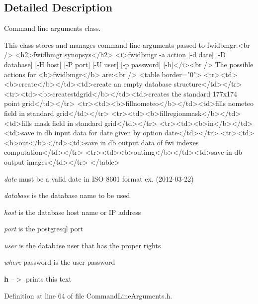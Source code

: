 \subsection{Detailed Description}
Command line arguments class. 

\begin{DoxyVerb}     This class stores and manages command line arguments passed to fwidbmgr.<br />
     <h2>fwidbmgr synopsys</h2>
     <i>fwidbmgr -a action [-d date] [-D database] [-H host] [-P port] [-U user] [-p password] [-h]</i><br />
     The possible actions for <b>fwidbmgr</b> are:<br />
     <table border="0">
       <tr><td><b>create</b></td><td>create an empty database structure</td></tr>
       <tr><td><b>createstdgrid</b></td><td>creates the standard 177x174 point grid</td></tr>
       <tr><td><b>fillnometeo</b></td><td>fills nometeo field in standard grid</td></tr>
       <tr><td><b>fillregionmask</b></td><td>fills mask field in standard grid</td></tr>
       <tr><td><b>in</b></td><td>save in db input data for date given by option date</td></tr>
       <tr><td><b>out</b></td><td>save in db output data of fwi indexes computation</td></tr>
       <tr><td><b>outimg</b></td><td>save in db output images</td></tr>
     </table>
\end{DoxyVerb}



\begin{DoxyItemize}
\item {\itshape date} must be a valid date in I\-S\-O 8601 format ex. (2012-\/03-\/22)
\item {\itshape database} is the database name to be used
\item {\itshape host} is the database host name or I\-P address
\item {\itshape port} is the postgresql port
\item {\itshape user} is the database user that has the proper rights
\item {\itshape where} password is the user password

{\bfseries h} --$>$ prints this text 
\end{DoxyItemize}

Definition at line 64 of file Command\-Line\-Arguments.\-h.



